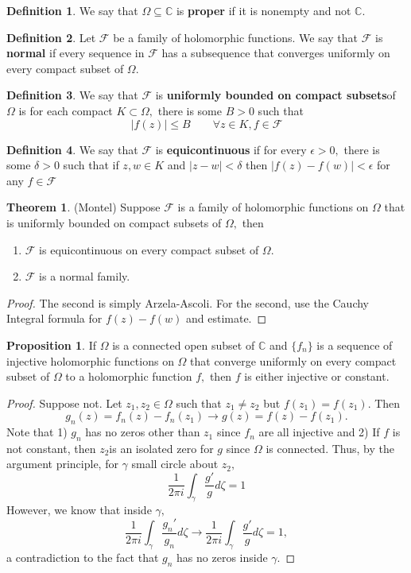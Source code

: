 \documentclass[10pt, oneside]{article}
\newcommand{\bbC}{\mathbb{C}}
\theoremstyle{definition}
\newtheorem{thm}{Theorem}
\newtheorem{defn}{Definition}
\newtheorem{prop}{Proposition}
\newcommand{\bbC}{\mathbb{C}}
\begin{document}
\begin{defn}
    We say that $\Omega\subseteq \bbC$ is \textbf{proper} if it is nonempty and not $\bbC.$
\end{defn}
\begin{defn}
    Let $\mathcal{F}$ be a family of holomorphic functions. We say that $\mathcal{F}$ is \textbf{normal} if every sequence in $\mathcal{F}$ has a subsequence that converges uniformly on every compact subset of $\Omega.$
\end{defn}
\begin{defn}
    We say that $\mathcal{F}$ is \textbf{uniformly bounded on compact subsets}of $\Omega$ is for each compact $K\subset \Omega,$ there is some $B>0$ such that 
    \[|f(z)| \leq B \qquad \forall z \in K, f\in \mathcal{F}\]
 \end{defn}
 \begin{defn}
     We say that $\mathcal{F}$ is \textbf{equicontinuous} if for every $\epsilon>0,$ there is some $\delta>0$ such that  if $z,w \in K$ and $|z - w| < \delta$ then $|f(z) - f(w)| < \epsilon$ for any $f \in \mathcal{F}$
 \end{defn}
 \begin{thm}
     (Montel) Suppose $\mathcal{F}$ is a family of holomorphic functions on $\Omega$ that is uniformly bounded on compact subsets of $\Omega,$ then 
     \begin{enumerate}
         \item $\mathcal{F}$ is equicontinuous on every compact subset of $\Omega$.
         \item $\mathcal{F}$ is a normal family.
     \end{enumerate}
 \end{thm}
 \begin{proof}
     The second is simply Arzela-Ascoli. For the second, use the Cauchy Integral formula for $f(z) - f(w)$ and estimate.   
 \end{proof}

\begin{prop}
    If $\Omega$ is a connected open subset of $\bbC$ and $\{f_n\}$ is a sequence of injective holomorphic functions on $\Omega$  that converge uniformly on every compact subset of $\Omega$ to a holomorphic function $f,$ then $f$ is either injective or constant. 
\end{prop}
\begin{proof}
    Suppose not. Let $z_1, z_2 \in \Omega$ such that $z_1\neq z_2$ but $f(z_1) = f(z_1).$ Then 
    \[g_n(z) = f_n(z) - f_n(z_1) \to g(z) = f(z) - f(z_1).\] Note that 1) $g_n$ has no zeros other than $z_1$ since $f_n$ are all injective and 2) If $f$ is not constant, then $z_2$is an isolated zero for $g$ since $\Omega$ is connected. Thus, by the argument principle, for $\gamma$ small circle about $z_2,$
    \[\frac{1}{2\pi i} \int_\gamma \frac{g'}{g}d\zeta = 1\] However, we know that inside $\gamma,$
    \[\frac{1}{2\pi i}\int_\gamma \frac{g_n'}{g_n}d\zeta \to \frac{1}{2\pi i}\int_\gamma \frac{g'}{g}d\zeta = 1,\] a contradiction to the fact that $g_n$ has no zeros inside $\gamma.$ 
\end{proof}
\end{document}
